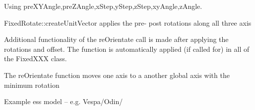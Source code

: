      Using preXYAngle,preZAngle,xStep,yStep,zStep,xyAngle,zAngle.

     FixedRotate::createUnitVector applies the pre- post rotations along
     all three axis


     Additional functionality of the reOrientate call is made after
     applying the rotations and offset. The function is automatically
     applied (if called for) in all of the FixedXXX class.

     The reOrientate function moves one axis to a another global axis with
     the minimum rotation

     Example ess model -- e.g. Vespa/Odin/
     
